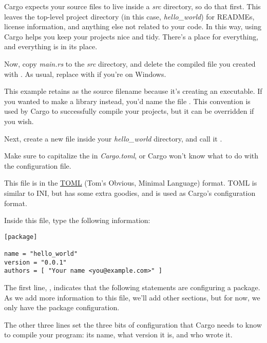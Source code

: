 Cargo expects your source files to live inside a \emph{src} directory, so do that first. This leaves the top-level 
project directory (in this case, \emph{hello\_world}) for READMEs, license information, and anything else not related 
to your code. In this way, using Cargo helps you keep your projects nice and tidy. There's a place for everything, 
and everything is in its place.

\blank

Now, copy \emph{main.rs} to the \emph{src} directory, and delete the compiled file you created with . As usual, 
replace  with  if you're on Windows.

\blank

This example retains  as the source filename because it's creating an executable. If you wanted to make a 
library instead, you'd name the file . This convention is used by Cargo to successfully compile your projects, 
but it can be overridden if you wish.


Next, create a new file inside your \emph{hello\_world} directory, and call it .

\blank

Make sure to capitalize the  in \emph{Cargo.toml}, or Cargo won't know what to do with the configuration file.

\blank

This file is in the \href{https://github.com/toml-lang/toml}{TOML} (Tom's Obvious, Minimal Language) format. TOML is similar 
to INI, but has some extra goodies, and is used as Cargo’s configuration format.

\blank

Inside this file, type the following information:

\begin{verbatim}
[package]

name = "hello_world"
version = "0.0.1"
authors = [ "Your name <you@example.com>" ] 
\end{verbatim}

The first line, \code{[package]}, indicates that the following statements are configuring a package. As we add more information 
to this file, we’ll add other sections, but for now, we only have the package configuration.

\blank

The other three lines set the three bits of configuration that Cargo needs to know to compile your program: its name, what 
version it is, and who wrote it.

